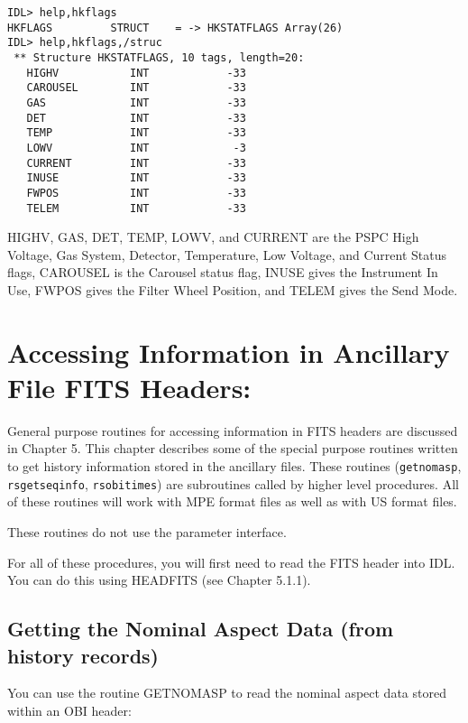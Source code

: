 \medskip\noindent
\begin{verbatim}
IDL> help,hkflags
HKFLAGS         STRUCT    = -> HKSTATFLAGS Array(26)
IDL> help,hkflags,/struc
 ** Structure HKSTATFLAGS, 10 tags, length=20:
   HIGHV           INT            -33
   CAROUSEL        INT            -33
   GAS             INT            -33
   DET             INT            -33
   TEMP            INT            -33
   LOWV            INT             -3
   CURRENT         INT            -33
   INUSE           INT            -33
   FWPOS           INT            -33
   TELEM           INT            -33
\end{verbatim}
HIGHV, GAS, DET, TEMP, LOWV, and CURRENT are the PSPC High Voltage, Gas System,
Detector, Temperature, Low Voltage, and Current Status flags, CAROUSEL is the
Carousel status flag, INUSE gives the Instrument In Use, FWPOS gives the Filter
Wheel Position, and TELEM gives the Send Mode.
 

\section{Accessing Information in Ancillary File FITS Headers:}
 
General purpose routines for accessing information in FITS headers are
discussed in Chapter 5. This chapter describes some of the special purpose
routines written to get history information stored in the ancillary files.
These routines ({\tt getnomasp}, {\tt rsgetseqinfo}, {\tt rsobitimes}) are subroutines
called by higher level procedures.  All of these routines will work with MPE
format files as well as with US format files.
 
These routines do not use the parameter interface.
 
For all of these procedures, you will first need to read the FITS header into
IDL. You can do this using HEADFITS (see Chapter 5.1.1).
 

\subsection{Getting the Nominal Aspect Data (from history records)}
 
You can use the routine GETNOMASP to read the nominal aspect data stored
within an OBI header:

